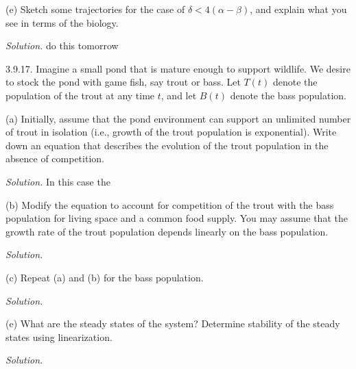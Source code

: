 \documentclass{article}
\begin{document}
\vspace{5mm}

(e) Sketch some trajectories for the case of $\delta < 4(\alpha - \beta)$,
and explain what you see in terms of the biology.

\textit{Solution.}
do this tomorrow

\newpage

3.9.17. Imagine a small pond that is mature enough to support wildlife.
We desire to stock the pond with game fish, say trout or bass. Let $T(t)$
denote the population of the trout at any time $t$, and let $B(t)$
denote the bass population.

(a) Initially, assume that the pond environment can support an unlimited
number of trout in isolation (i.e., growth of the trout population is
exponential). Write down an equation that describes the evolution of the
trout population in the absence of competition.

\textit{Solution.}
In this case the 

\vspace{5mm}

(b) Modify the equation to account for competition of the trout with the
bass population for living space and a common food supply. You may assume
that the growth rate of the trout population depends linearly on the bass
population.

\textit{Solution.}

\vspace{5mm}

(c) Repeat (a) and (b) for the bass population.

\textit{Solution.}

\vspace{5mm}

(e) What are the steady states of the system? Determine stability of the
steady states using linearization.

\textit{Solution.}
\end{document}
